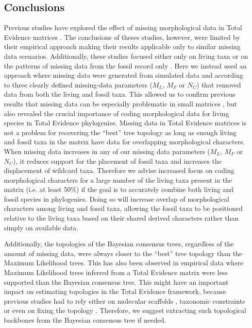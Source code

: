 \subsection{Conclusions}
Previous studies have explored the effect of missing morphological data in Total Evidence matrices \citep{Wiens01102005,manosphylogeny2007,pattinsonphylogeny2014}.
The conclusions of theses studies, however, were limited by their empirical approach making their results applicable only to similar missing data scenarios.
Additionally, these studies focused either only on living taxa \citep{Wiens01102005} or on the patterns of missing data from the fossil record only \citep{manosphylogeny2007,pattinsonphylogeny2014}.
Here we instead used an approach where missing data were generated from simulated data and according to three clearly defined missing-data parameters ($M_{L}$, $M_{F}$ or $N_{C}$) that removed data from both the living and fossil taxa.
This allowed us to confirm previous results that missing data can be especially problematic in small matrices \citep{wiensmissing2003}, but also revealed the crucial importance of coding morphological data for living species in Total Evidence phylogenies.
Missing data in Total Evidence matrices is not a problem for recovering the ``best'' tree topology as long as enough living and fossil taxa in the matrix have data for overlapping morphological characters.
When missing data increases in any of our missing data parameters ($M_{L}$, $M_{F}$ or $N_{C}$), it reduces support for the placement of fossil taxa and increases the displacement of wildcard taxa.
Therefore we advise increased focus on coding morphological characters for a large number of the living taxa present in the matrix (i.e. at least 50\%) if the goal is to accurately combine both living and fossil species in phylogenies.
Doing so will increase overlap of morphological characters among living and fossil taxa, allowing the fossil taxa to be positioned relative to the living taxa based on their shared derived characters rather than simply on available data.

Additionally, the topologies of the Bayesian consensus trees, regardless of the amount of missing data, were always closer to the ``best'' tree topology than the Maximum Likelihood trees.
This has also been observed in empirical data \citep[e.g.][]{Arcila2015131} where Maximum Likelihood trees inferred from a Total Evidence matrix were less supported than the Bayesian consensus tree.
This might have an important impact on estimating topologies in the Total Evidence framework, because previous studies had to rely either on molecular scaffolds \citep[e.g.][]{Slater2012MEE}, taxonomic constraints \citep[e.g.][]{Slater2012MEE,beckancient2014} or even on fixing the topology \citep[e.g.][]{ronquista2012}.
Therefore, we suggest extracting such topological backbones from the Bayesian consensus tree if needed.
